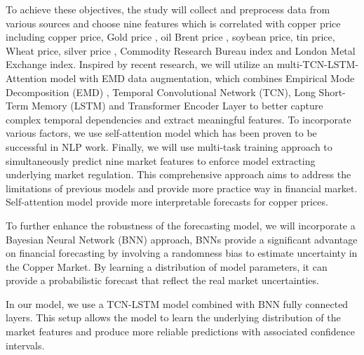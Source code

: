 \documentclass[final-report]{report-template}
\begin{document}
To achieve these objectives, the study will collect and preprocess data from various sources and choose nine features which is correlated with copper price including copper price, Gold price , oil Brent price \cite{BILDIRICI2015397} , soybean price, tin price, Wheat price, silver price \cite{BILDIRICI2015397} , Commodity Research Bureau index and London Metal Exchange index. Inspired by recent research, we will utilize an multi-TCN-LSTM-Attention model \cite{CAO2019127} with EMD data augmentation, which combines Empirical Mode Decomposition (EMD) \cite{kim2009emd} , Temporal Convolutional Network (TCN), Long Short-Term Memory (LSTM) and Transformer Encoder Layer to better capture complex temporal dependencies and extract meaningful features. To incorporate various factors, we use self-attention model which has been proven to be successful in NLP work. Finally, we will use multi-task training approach to simultaneously predict nine market features to enforce model extracting underlying market regulation. This comprehensive approach aims to address the limitations of previous models and provide more practice way in financial market. Self-attention model provide more interpretable forecasts for copper prices.  

To further enhance the robustness of the forecasting model, we will incorporate a Bayesian Neural Network (BNN) approach, BNNs provide a significant advantage on financial forecasting by involving a  randomness bias to estimate uncertainty in the Copper Market. By learning a distribution of model parameters, it can provide a probabilistic forecast that reflect the real market uncertainties.

In our model, we use a TCN-LSTM model combined with BNN fully connected layers. This setup allows the model to learn the underlying distribution of the market features and produce more reliable predictions with associated confidence intervals. 

\end{document}

